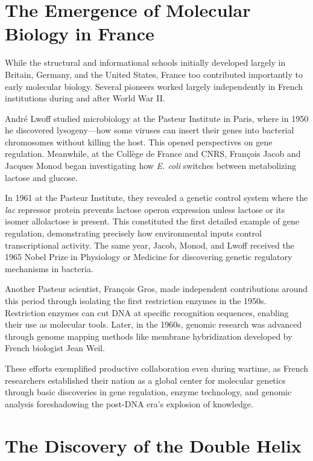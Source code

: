\section{The Emergence of Molecular Biology in France}

While the structural and informational schools initially developed largely in Britain, Germany, and the United States, France too contributed importantly to early molecular biology. Several pioneers worked largely independently in French institutions during and after World War II.

André Lwoff studied microbiology at the Pasteur Institute in Paris, where in 1950 he discovered lysogeny---how some viruses can insert their genes into bacterial chromosomes without killing the host. This opened perspectives on gene regulation. Meanwhile, at the Collège de France and CNRS, François Jacob and Jacques Monod began investigating how \emph{E. coli} switches between metabolizing lactose and glucose.

In 1961 at the Pasteur Institute, they revealed a genetic control system where the \emph{lac} repressor protein prevents lactose operon expression unless lactose or its isomer allolactose is present. This constituted the first detailed example of gene regulation, demonstrating precisely how environmental inputs control transcriptional activity. The same year, Jacob, Monod, and Lwoff received the 1965 Nobel Prize in Physiology or Medicine for discovering genetic regulatory mechanisms in bacteria.

Another Pasteur scientist, François Gros, made independent contributions around this period through isolating the first restriction enzymes in the 1950s. Restriction enzymes can cut DNA at specific recognition sequences, enabling their use as molecular tools. Later, in the 1960s, genomic research was advanced through genome mapping methods like membrane hybridization developed by French biologist Jean Weil.

These efforts exemplified productive collaboration even during wartime, as French researchers established their nation as a global center for molecular genetics through basic discoveries in gene regulation, enzyme technology, and genomic analysis foreshadowing the post-DNA era's explosion of knowledge.

\section{The Discovery of the Double Helix}

